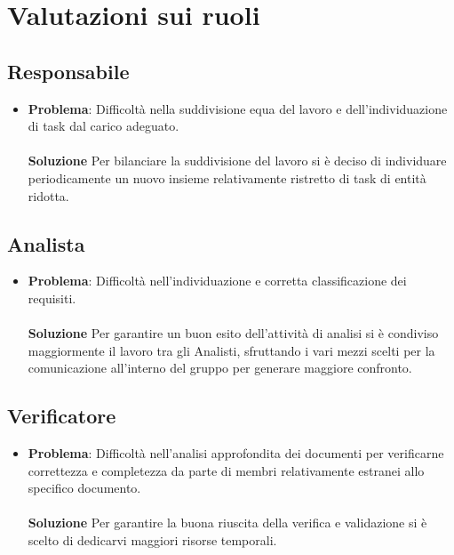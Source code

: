 \documentclass[openany,12pt,a4paper]{report}
\begin{document}
\section{Valutazioni sui ruoli}

\subsection{Responsabile}

\begin{itemize}
	\item \textbf{Problema}: Difficoltà nella suddivisione equa del lavoro e dell'individuazione di task dal carico adeguato. \\ \\
	\textbf{Soluzione} Per bilanciare la suddivisione del lavoro si è deciso di individuare periodicamente un nuovo insieme relativamente ristretto di task di entità ridotta.
\end{itemize}

\subsection{Analista}

\begin{itemize}
	\item \textbf{Problema}: Difficoltà nell'individuazione e corretta classificazione dei requisiti. \\ \\
	\textbf{Soluzione} Per garantire un buon esito dell'attività di analisi si è condiviso maggiormente il lavoro tra gli Analisti, sfruttando i vari mezzi scelti per la comunicazione
	all'interno del gruppo per generare maggiore confronto.
\end{itemize}

\subsection{Verificatore}

\begin{itemize}
	\item \textbf{Problema}: Difficoltà nell'analisi approfondita dei documenti per verificarne correttezza e completezza da parte di membri relativamente estranei allo specifico documento. \\ \\
	\textbf{Soluzione} Per garantire la buona riuscita della verifica e validazione si è scelto di dedicarvi maggiori risorse temporali.
\end{itemize}
\end{document}
